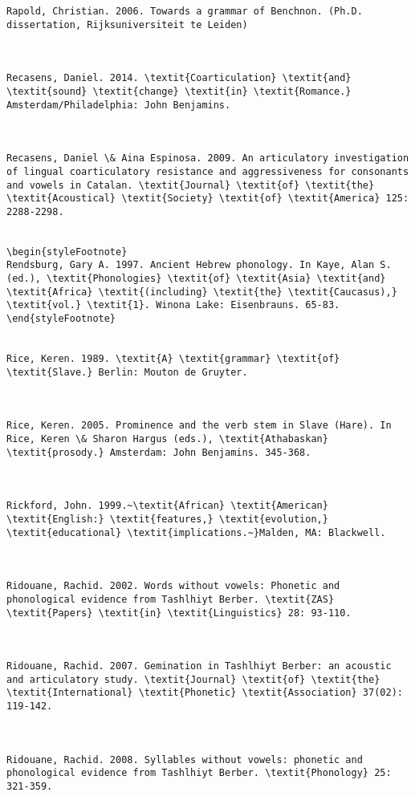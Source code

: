 \begin{verbatim}
Rapold, Christian. 2006. Towards a grammar of Benchnon. (Ph.D. dissertation, Rijksuniversiteit te Leiden)



Recasens, Daniel. 2014. \textit{Coarticulation} \textit{and} \textit{sound} \textit{change} \textit{in} \textit{Romance.} Amsterdam/Philadelphia: John Benjamins.



Recasens, Daniel \& Aina Espinosa. 2009. An articulatory investigation of lingual coarticulatory resistance and aggressiveness for consonants and vowels in Catalan. \textit{Journal} \textit{of} \textit{the} \textit{Acoustical} \textit{Society} \textit{of} \textit{America} 125: 2288-2298.


\begin{styleFootnote}
Rendsburg, Gary A. 1997. Ancient Hebrew phonology. In Kaye, Alan S. (ed.), \textit{Phonologies} \textit{of} \textit{Asia} \textit{and} \textit{Africa} \textit{(including} \textit{the} \textit{Caucasus),} \textit{vol.} \textit{1}. Winona Lake: Eisenbrauns. 65-83.
\end{styleFootnote}


Rice, Keren. 1989. \textit{A} \textit{grammar} \textit{of} \textit{Slave.} Berlin: Mouton de Gruyter.



Rice, Keren. 2005. Prominence and the verb stem in Slave (Hare). In Rice, Keren \& Sharon Hargus (eds.), \textit{Athabaskan} \textit{prosody.} Amsterdam: John Benjamins. 345-368.



Rickford, John. 1999.~\textit{African} \textit{American} \textit{English:} \textit{features,} \textit{evolution,} \textit{educational} \textit{implications.~}Malden, MA: Blackwell. 



Ridouane, Rachid. 2002. Words without vowels: Phonetic and phonological evidence from Tashlhiyt Berber. \textit{ZAS} \textit{Papers} \textit{in} \textit{Linguistics} 28: 93-110.



Ridouane, Rachid. 2007. Gemination in Tashlhiyt Berber: an acoustic and articulatory study. \textit{Journal} \textit{of} \textit{the} \textit{International} \textit{Phonetic} \textit{Association} 37(02): 119-142.



Ridouane, Rachid. 2008. Syllables without vowels: phonetic and phonological evidence from Tashlhiyt Berber. \textit{Phonology} 25: 321-359.




\end{verbatim}
